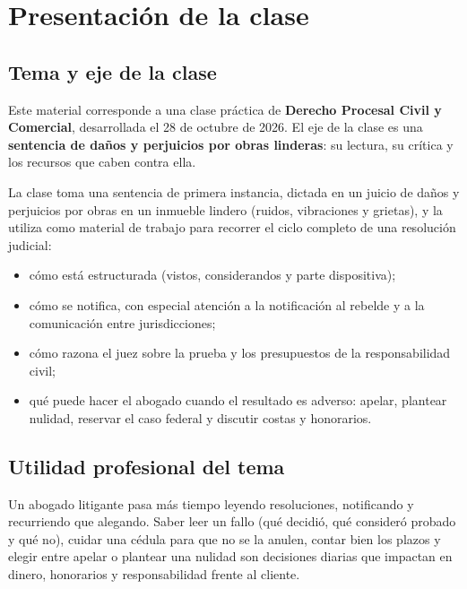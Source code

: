\documentclass[12pt,oneside]{book}
\begin{document}

\chapter[Presentaci\'on de la clase]{Presentaci\'on de la clase}

\section{Tema y eje de la clase}

Este material corresponde a una clase pr\'actica de \textbf{Derecho Procesal Civil y Comercial}, desarrollada el 28 de octubre de 2026. El eje de la clase es una \textbf{sentencia de da\~nos y perjuicios por obras linderas}: su lectura, su cr\'itica y los recursos que caben contra ella.

La clase toma una sentencia de primera instancia, dictada en un juicio de da\~nos y perjuicios por obras en un inmueble lindero (ruidos, vibraciones y grietas), y la utiliza como material de trabajo para recorrer el ciclo completo de una resoluci\'on judicial:
\begin{itemize}
    \item c\'omo est\'a estructurada (vistos, considerandos y parte dispositiva);
    \item c\'omo se notifica, con especial atenci\'on a la notificaci\'on al rebelde y a la comunicaci\'on entre jurisdicciones;
    \item c\'omo razona el juez sobre la prueba y los presupuestos de la responsabilidad civil;
    \item qu\'e puede hacer el abogado cuando el resultado es adverso: apelar, plantear nulidad, reservar el caso federal y discutir costas y honorarios.
\end{itemize}

\section{Utilidad profesional del tema}

\begin{important}
Un abogado litigante pasa m\'as tiempo leyendo resoluciones, notificando y recurriendo que alegando. Saber leer un fallo (qu\'e decidi\'o, qu\'e consider\'o probado y qu\'e no), cuidar una c\'edula para que no se la anulen, contar bien los plazos y elegir entre apelar o plantear una nulidad son decisiones diarias que impactan en dinero, honorarios y responsabilidad frente al cliente.
\end{important}
\end{document}
